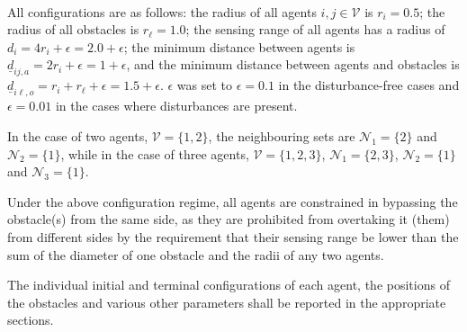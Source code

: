 \noindent{}\\[2.5ex]

All configurations are as follows: the radius of all agents
$i,j \in \mathcal{V}$ is $r_i = 0.5$; the radius of all obstacles is
$r_{\ell} = 1.0$; the sensing range of all agents has a radius of
$d_i = 4r_i + \epsilon = 2.0 + \epsilon$; the minimum distance between agents
is $\underline{d}_{ij,a} = 2r_i + \epsilon = 1 + \epsilon$, and the minimum
distance between agents and obstacles is
$\underline{d}_{i\ell,o} = r_i + r_{\ell} + \epsilon = 1.5 + \epsilon$.
$\epsilon$ was set to $\epsilon = 0.1$ in the disturbance-free cases and
$\epsilon = 0.01$ in the cases where disturbances are present.

In the case of two agents, $\mathcal{V} = \{1,2\}$,
the neighbouring sets are $\mathcal{N}_1 = \{2\}$
and $\mathcal{N}_2 = \{1\}$, while in the case of three agents,
$\mathcal{V} = \{1,2,3\}$, $\mathcal{N}_1 = \{2,3\}$,
$\mathcal{N}_2 = \{1\}$ and $\mathcal{N}_3 = \{1\}$.

Under the above configuration regime, all agents are constrained in bypassing
the obstacle(s) from the same side, as they are prohibited from overtaking it
(them) from different sides by the requirement that their sensing range be
lower than the sum of the diameter of one obstacle and the radii of any two
agents.

The individual initial and terminal configurations of each agent, the positions
of the obstacles and various other parameters shall be reported in the
appropriate sections.
